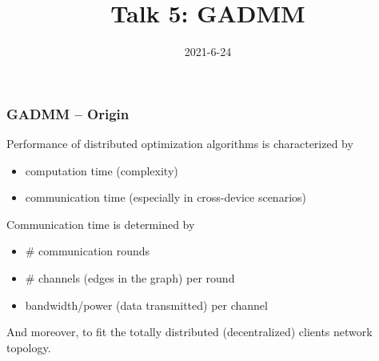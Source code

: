 \usepackage{nccmath}




\title[Personalization]{Talk 5: GADMM}
\date{2021-6-24}




\setlength{\belowdisplayskip}{5pt} \setlength{\belowdisplayshortskip}{5pt}
\setlength{\abovedisplayskip}{5pt} \setlength{\abovedisplayshortskip}{5pt}


\begin{frame}
\titlepage %
\end{frame}


\begin{frame}
\frametitle{GADMM -- Origin}

Performance of distributed optimization algorithms is characterized by
\begin{itemize}
    \item computation time (complexity)
    \item communication time (especially in cross-device scenarios)
\end{itemize}

\pause
\vspace{0.6em}

Communication time is determined by
\begin{itemize}
    \item \# communication rounds
    \item {\color{green} \# channels (edges in the graph) per round}
    \item {\color{pink} bandwidth/power (data transmitted) per channel}
\end{itemize}

\pause
\vspace{0.6em}

And moreover, to fit the totally distributed (decentralized) clients network topology.

\end{frame}

